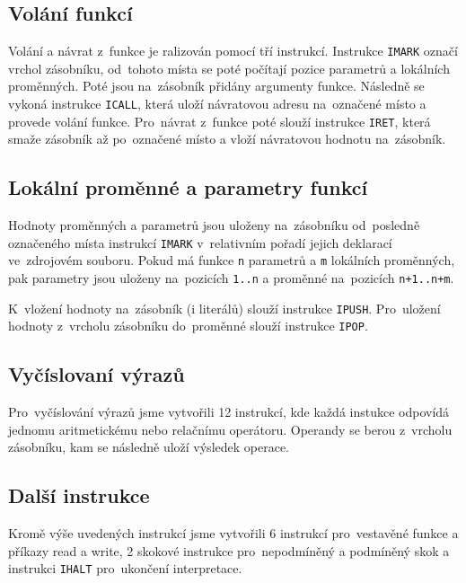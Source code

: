 \documentclass[12pt,a4paper,titlepage,final]{article}
\begin{document}
\subsection{Volání funkcí} \label{fcall}
Volání a návrat z~funkce je ralizován pomocí tří instrukcí. Instrukce \texttt{IMARK}
označí vrchol zásobníku, od~tohoto místa se poté počítají pozice parametrů a lokálních
proměnných. Poté jsou na~zásobník přidány argumenty funkce. Následně se vykoná
instrukce \texttt{ICALL}, která uloží návratovou adresu na~označené místo a
provede volání funkce. Pro~návrat z~funkce poté slouží instrukce \texttt{IRET},
která smaže zásobník až po~označené místo a vloží návratovou hodnotu na~zásobník.

\subsection{Lokální proměnné a parametry funkcí}
Hodnoty proměnných a parametrů jsou uloženy na~zásobníku od~posledně označeného
místa instrukcí \texttt{IMARK} v~relativním pořadí jejich deklarací ve~zdrojovém souboru. Pokud má funkce
\texttt{n} parametrů a \texttt{m} lokálních proměnných, pak parametry jsou uloženy na~pozicích
\texttt{1..n} a proměnné na~pozicích \texttt{n+1..n+m}.

K~vložení hodnoty na~zásobník (i literálů) slouží instrukce \texttt{IPUSH}.
Pro~uložení hodnoty z~vrcholu zásobníku do~proměnné slouží instrukce \texttt{IPOP}.

\subsection{Vyčíslovaní výrazů}
Pro~vyčíslování výrazů jsme vytvořili 12 instrukcí, kde každá instukce
odpovídá jednomu aritmetickému nebo relačnímu operátoru. Operandy se
berou z~vrcholu zásobníku, kam se následně uloží výsledek operace.

\subsection{Další instrukce}
Kromě výše uvedených instrukcí jsme vytvořili 6 instrukcí pro~vestavěné funkce
a příkazy read a write, 2 skokové instrukce pro~nepodmíněný a podmíněný skok
a instrukci \texttt{IHALT} pro~ukončení interpretace.
\end{document}
